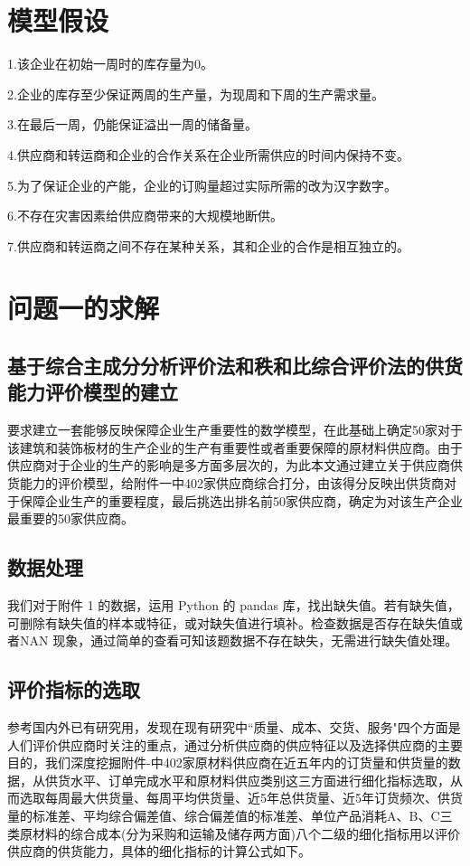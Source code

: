 \documentclass[UTF8]{ctexart}
\begin{document}
\section{模型假设}
1.该企业在初始一周时的库存量为0。

2.企业的库存至少保证两周的生产量，为现周和下周的生产需求量。

3.在最后一周，仍能保证溢出一周的储备量。

4.供应商和转运商和企业的合作关系在企业所需供应的时间内保持不变。

5.为了保证企业的产能，企业的订购量超过实际所需的改为汉字数字。

6.不存在灾害因素给供应商带来的大规模地断供。

7.供应商和转运商之间不存在某种关系，其和企业的合作是相互独立的。



\section{问题一的求解}
\subsection{基于综合主成分分析评价法和秩和比综合评价法的供货能力评价模型的建立}

要求建立一套能够反映保障企业生产重要性的数学模型，在此基础上确定50家对于该建筑和装饰板材的生产企业的生产有重要性或者重要保障的原材料供应商。由于供应商对于企业的生产的影响是多方面多层次的，为此本文通过建立关于供应商供货能力的评价模型，给附件一中402家供应商综合打分，由该得分反映出供货商对于保障企业生产的重要程度，最后挑选出排名前50家供应商，确定为对该生产企业最重要的50家供应商。

\subsection{数据处理}
我们对于附件 1 的数据，运用 Python 的 pandas 库，找出缺失值。若有缺失值，可删除有缺失值的样本或特征，或对缺失值进行填补。检查数据是否存在缺失值或者NAN 现象，通过简单的查看可知该题数据不存在缺失，无需进行缺失值处理。

\subsection{评价指标的选取}
参考国内外已有研究用，发现在现有研究中“质量、成本、交货、服务"四个方面是人们评价供应商时关注的重点，通过分析供应商的供应特征以及选择供应商的主要目的，我们深度挖掘附件-中402家原材料供应商在近五年内的订货量和供货量的数据，从供货水平、订单完成水平和原材料供应类别这三方面进行细化指标选取，从而选取每周最大供货量、每周平均供货量、近5年总供货量、近5年订货频次、供货量的标准差、平均综合偏差值、综合偏差值的标准差、单位产品消耗A、B、C三类原材料的综合成本(分为采购和运输及储存两方面)八个二级的细化指标用以评价供应商的供货能力，具体的细化指标的计算公式如下。
\end{document}
